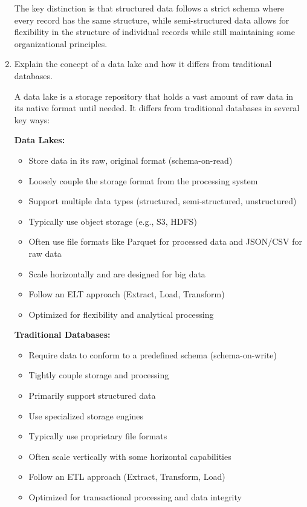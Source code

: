 \documentclass[12pt]{article}
\begin{document}
\begin{enumerate}
\begin{tcolorbox}[colback=blue!5!white,colframe=blue!75!black,title=Solution]
    The key distinction is that structured data follows a strict schema where every record has the same structure, while semi-structured data allows for flexibility in the structure of individual records while still maintaining some organizational principles.
    \end{tcolorbox}
    
    \item Explain the concept of a data lake and how it differs from traditional databases.
    
    \begin{tcolorbox}[colback=blue!5!white,colframe=blue!75!black,title=Solution]
    A data lake is a storage repository that holds a vast amount of raw data in its native format until needed. It differs from traditional databases in several key ways:
    
    \textbf{Data Lakes:}
    \begin{itemize}
        \item Store data in its raw, original format (schema-on-read)
        \item Loosely couple the storage format from the processing system
        \item Support multiple data types (structured, semi-structured, unstructured)
        \item Typically use object storage (e.g., S3, HDFS)
        \item Often use file formats like Parquet for processed data and JSON/CSV for raw data
        \item Scale horizontally and are designed for big data
        \item Follow an ELT approach (Extract, Load, Transform)
        \item Optimized for flexibility and analytical processing
    \end{itemize}
    
    \textbf{Traditional Databases:}
    \begin{itemize}
        \item Require data to conform to a predefined schema (schema-on-write)
        \item Tightly couple storage and processing
        \item Primarily support structured data
        \item Use specialized storage engines
        \item Typically use proprietary file formats
        \item Often scale vertically with some horizontal capabilities
        \item Follow an ETL approach (Extract, Transform, Load)
        \item Optimized for transactional processing and data integrity
    \end{itemize}
    

\end{tcolorbox}
\end{enumerate}
\end{document}

